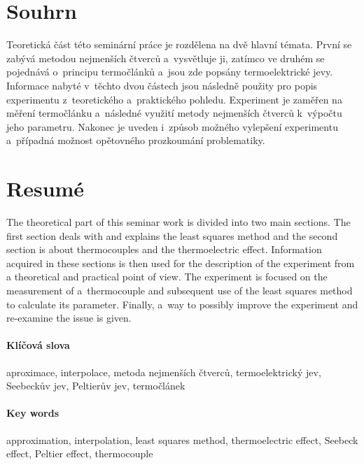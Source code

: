 \section[Souhrn (Resumé)]{Souhrn}
Teoretická část této seminární práce je rozdělena na dvě hlavní témata.
První se zabývá metodou nejmenších čtverců a~vysvětluje ji, zatímco ve
druhém se pojednává o~principu termočlánků a~jsou zde popsány termoelektrické
jevy. Informace nabyté v~těchto dvou částech jsou následně použity pro popis
experimentu z~teoretického a~praktického pohledu. Experiment je zaměřen na
měření termočlánku a~následné využití metody nejmenších čtverců k~výpočtu jeho
parametru. Nakonec je uveden i~způsob možného vylepšení experimentu a~případná
možnost opětovného prozkoumání problematiky.

\section*{Resumé}
The theoretical part of this seminar work is divided into two main sections. The first
section deals with and explains the least squares method and the second section is
about thermocouples and the thermoelectric effect. Information acquired in these
sections is then used for the description of the experiment from a theoretical and
practical point of view. The experiment is focused on the measurement of
a~thermocouple and subsequent use of the least squares method to calculate its
parameter. Finally, a~way to possibly improve the experiment and re-examine the
issue is given.



\paragraph{Klíčová slova}
aproximace, interpolace, metoda nejmenších čtverců, termoelektrický jev, 
Seebeckův jev, Peltierův jev, termočlánek

\paragraph{Key words}
approximation, interpolation, least squares method, thermoelectric effect, 
Seebeck effect, Peltier effect, thermocouple

